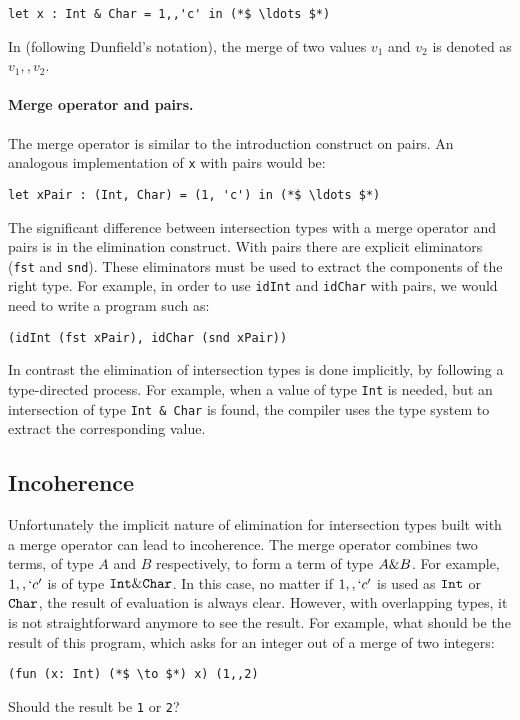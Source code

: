 \begin{lstlisting}
let x : Int & Char = 1,,'c' in (*$ \ldots $*)
\end{lstlisting}

\noindent In \namedis (following Dunfield's notation), the
merge of two values $v_1$ and $v_2$ is denoted as $v_1 ,, v_2$.

\paragraph{Merge operator and pairs.}
The merge operator is similar to the introduction construct on pairs.
An analogous implementation of \lstinline{x} with pairs would be:

\begin{lstlisting}
let xPair : (Int, Char) = (1, 'c') in (*$ \ldots $*)
\end{lstlisting}

\noindent The significant difference between intersection types with a
merge operator and pairs is in the elimination construct. With pairs
there are explicit eliminators (\lstinline{fst} and
\lstinline{snd}). These eliminators must be used to extract the
components of the right type. For example, in order to use
\lstinline{idInt} and \lstinline{idChar} with pairs, we would need to
write a program such as:

\begin{lstlisting}
(idInt (fst xPair), idChar (snd xPair))
\end{lstlisting}

\noindent In contrast the elimination of intersection types is done
implicitly, by following a type-directed process. For example,
when a value of type \lstinline{Int} is needed, but an intersection
of type \lstinline{Int & Char} is found, the compiler uses the
type system to extract the corresponding value.

\subsection{Incoherence}\label{subsec:incoherence}
Unfortunately the implicit nature of elimination for intersection
types built with a merge operator can lead to incoherence.
The merge operator combines two terms, of type $A$ and $B$
respectively, to form a term of type $A \& B$. For example,
$1 ,, `c'$ is of type $\texttt{Int} \& \texttt{Char}$. In this case, no
matter if $1 ,, `c'$ is used as $\texttt{Int}$ or $\texttt{Char}$, the result
of evaluation is always clear. However, with overlapping types, it is
not straightforward anymore to see the result. For example, what
should be the result of this program, which asks for an integer out of
a merge of two integers:
\begin{lstlisting}
(fun (x: Int) (*$ \to $*) x) (1,,2)
\end{lstlisting}
Should the result be \lstinline$1$ or \lstinline$2$?

